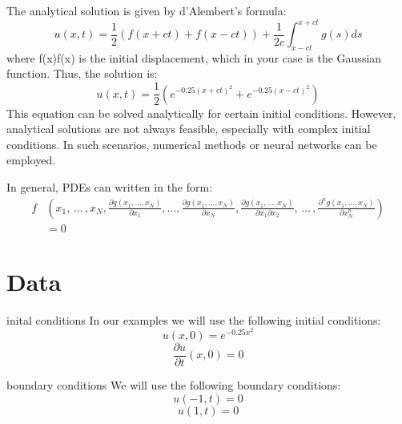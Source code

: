 \documentclass[twoside,11pt]{report}
\begin{document}
    The analytical solution is given by d'Alembert’s formula:
    \begin{equation} 
    u(x,t) = \frac{1}{2}(f(x+ct)+f(x-ct)) + \frac{1}{2c}\int_{x-ct}^{x+ct}g(s)ds
    \end{equation}
    where f(x)f(x) is the initial displacement, which in your case is the Gaussian function. Thus, the solution is:
    \begin{equation}
    u(x,t) = \frac{1}{2}(e^{-0.25(x+ct)^2}+e^{-0.25(x-ct)^2})
    \end{equation}
    This equation can be solved analytically for certain initial conditions. However, analytical 
    solutions are not always feasible, especially with complex initial conditions. In such scenarios, 
    numerical methods or neural networks can be employed.

    In general, PDEs can written in the form:
    \begin{align*} 
        f&\left(x_1, \, \dots \, , x_N, \frac{\partial g(x_1,\dots,x_N) }{\partial x_1}, 
            \dots , \frac{\partial g(x_1,\dots,x_N) }{\partial x_N}, \frac{\partial g(x_1,\dots,x_N) }
        {\partial x_1\partial x_2}, \, \dots \, , \frac{\partial^n g(x_1,\dots,x_N) }
        {\partial x_N^n} \right)
      \\ &= 0
    \end{align*}








\section{Data}
\label{sec:data}
    
    inital conditions
    In our examples we will use the following initial conditions:
    \begin{equation}
    u(x,0) = e^{-0.25x^2}
    \end{equation}
    \begin{equation}
    \frac{\partial u}{\partial t}(x,0) = 0
    \end{equation}



    boundary conditions
    We will use the following boundary conditions:
    \begin{equation}
    u(-1,t) = 0
    \end{equation}
    \begin{equation}
    u(1,t) = 0
    \end{equation}
\end{document}
